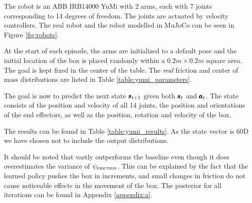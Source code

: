 The robot is an ABB IRB14000 YuMi with 2 arms, each with 7 joints corresponding to 14 degrees of freedom. The joints are actuated by velocity controllers. The real robot and the robot modelled in MuJoCo can be seen in Figure \ref{fig:robots}.

At the start of each episode, the arms are initialized to a default pose and the initial location of the box is placed randomly within a $0.2m \times 0.2m$ square area. The goal is kept fixed in the center of the table. The \emph{real} friction and center of mass distributions are listed in Table \ref{table:yumi_parameters}.

The goal is now to predict the next state $\pmb{s}_{t+1}$ given both $\pmb{s}_t$ and $\pmb{a}_t$. The state consists of the position and velocity of all 14 joints, the position and orientations of the end effectors, as well as the position, rotation and velocity of the box.

The results can be found in Table \ref{table:yumi_results}. As the state vector is 60D we have chosen not to include the output distributions.

It should be noted that \dettostoc{} vastly outperforms the baseline even though it does overestimates the variance of $\psi_{\textsc{friction}}{}$. This can be explained by the fact that the learned policy pushes the box in increments, and small changes in friction do not cause noticeable effects in the movement of the box. The posterior for all iterations can be found in Appendix \ref{appendix:a}.%



